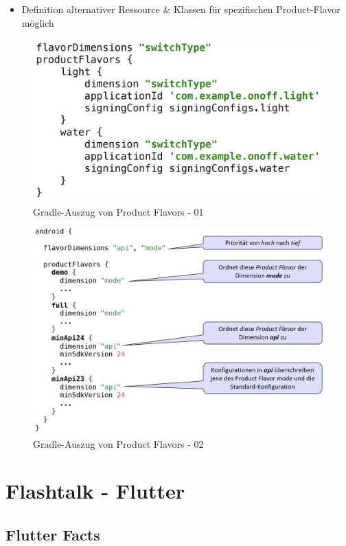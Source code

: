 \documentclass[a4paper]{article}
\begin{document}
{\begin{itemize}
\begin{itemize}
			\item Definition alternativer Ressource \& Klassen für spezifischen Product-Flavor möglich
			
		\end{itemize}
		
	\end{itemize}

	\newpage
	
	\begin{figure}[!htb]
		\centering
		\includegraphics[width=.5\textwidth]{img/flashtalk1/gradle_flavors1.png}
		\caption{Gradle-Auszug von Product Flavors - 01}
		\label{fig:flavors01}
	\end{figure}
	
	\begin{figure}[!htb]
		\centering
		\includegraphics[width=.9\textwidth]{img/flashtalk1/gradle_flavors2.png}
		\caption{Gradle-Auszug von Product Flavors - 02}
		\label{fig:flavors02}
	\end{figure}
	
\newpage

\section{Flashtalk - Flutter}

	\subsection{Flutter Facts}
	
}
\end{document}
